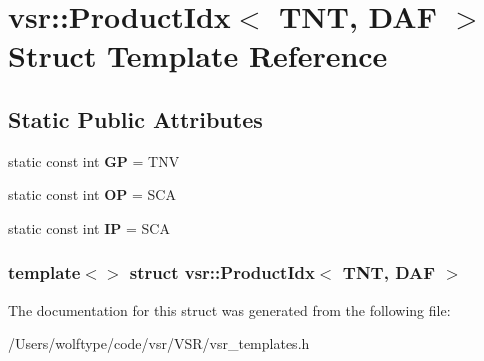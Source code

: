 \hypertarget{structvsr_1_1_product_idx_3_01_t_n_t_00_01_d_a_f_01_4}{\section{vsr\-:\-:Product\-Idx$<$ T\-N\-T, D\-A\-F $>$ Struct Template Reference}
\label{structvsr_1_1_product_idx_3_01_t_n_t_00_01_d_a_f_01_4}
}
\subsection*{Static Public Attributes}
\begin{DoxyCompactItemize}
\item 
\hypertarget{structvsr_1_1_product_idx_3_01_t_n_t_00_01_d_a_f_01_4_a792f1e7dfe8c9bf398b4a99c68f7bed4}{static const int {\bfseries G\-P} = T\-N\-V}\label{structvsr_1_1_product_idx_3_01_t_n_t_00_01_d_a_f_01_4_a792f1e7dfe8c9bf398b4a99c68f7bed4}

\item 
\hypertarget{structvsr_1_1_product_idx_3_01_t_n_t_00_01_d_a_f_01_4_ad16b5dd1f3c83d59d40789dd15b957f3}{static const int {\bfseries O\-P} = S\-C\-A}\label{structvsr_1_1_product_idx_3_01_t_n_t_00_01_d_a_f_01_4_ad16b5dd1f3c83d59d40789dd15b957f3}

\item 
\hypertarget{structvsr_1_1_product_idx_3_01_t_n_t_00_01_d_a_f_01_4_a101b56cbd0855c16dc5554f9d715d091}{static const int {\bfseries I\-P} = S\-C\-A}\label{structvsr_1_1_product_idx_3_01_t_n_t_00_01_d_a_f_01_4_a101b56cbd0855c16dc5554f9d715d091}

\end{DoxyCompactItemize}
\subsubsection*{template$<$$>$ struct vsr\-::\-Product\-Idx$<$ T\-N\-T, D\-A\-F $>$}



The documentation for this struct was generated from the following file\-:\begin{DoxyCompactItemize}
\item 
/\-Users/wolftype/code/vsr/\-V\-S\-R/vsr\-\_\-templates.\-h\end{DoxyCompactItemize}

